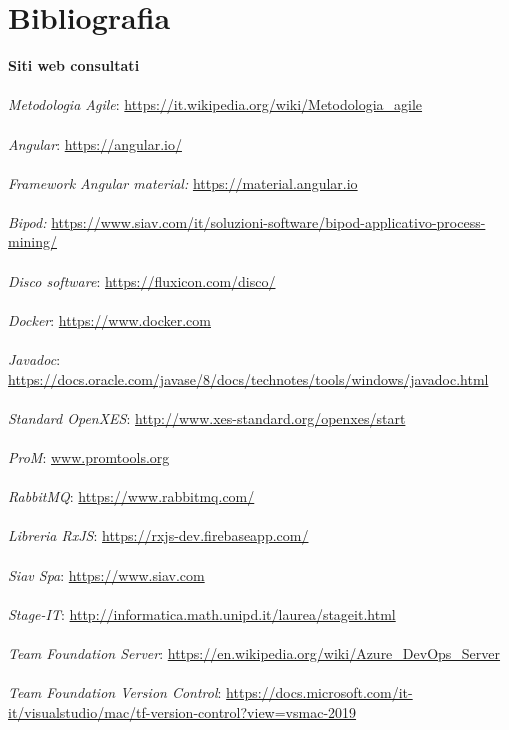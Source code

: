 

\cleardoublepage
\chapter{Bibliografia}
\textbf{\Large Siti web consultati}\\\\
\textit{Metodologia Agile}: \url{https://it.wikipedia.org/wiki/Metodologia_agile}\\\\
\textit{Angular}: \url{https://angular.io/}\\\\
\textit{Framework Angular material:} \url{https://material.angular.io}\\\\
\textit{Bipod:} \url{ https://www.siav.com/it/soluzioni-software/bipod-applicativo-process-mining/}\\\\
\textit{Disco software}: \url{https://fluxicon.com/disco/}\\\\
\textit{Docker}: \url{https://www.docker.com}\\\\
\textit{Javadoc}: \url{ https://docs.oracle.com/javase/8/docs/technotes/tools/windows/javadoc.html}\\\\
\textit{Standard OpenXES}: \url{http://www.xes-standard.org/openxes/start}\\\\
\textit{ProM}: \url{www.promtools.org}\\\\
\textit{RabbitMQ}: \url{https://www.rabbitmq.com/}\\\\
	\textit{Libreria RxJS}: \url{https://rxjs-dev.firebaseapp.com/}\\\\
	\textit{Siav Spa}: \url{https://www.siav.com}\\\\
	\textit{Stage-IT}: \url{http://informatica.math.unipd.it/laurea/stageit.html}\\\\
	\textit{Team Foundation Server}: \url{https://en.wikipedia.org/wiki/Azure_DevOps_Server}\\\\
	\textit{Team Foundation Version Control}: \url{https://docs.microsoft.com/it-it/visualstudio/mac/tf-version-control?view=vsmac-2019}\\\\
\nocite{*}



